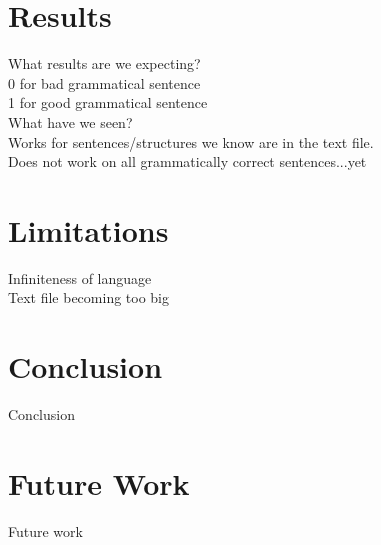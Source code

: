 \documentclass[12pt,a4paper]{article}
\begin{document}
\section{Results}
What results are we expecting?\\
0 for bad grammatical sentence\\
1 for good grammatical sentence\\

What have we seen?\\
Works for sentences/structures we know are in the text file.\\
Does not work on all grammatically correct sentences...yet\\



\section{Limitations}
Infiniteness of language\\
Text file becoming too big\\

\section{Conclusion}
Conclusion

\section{Future Work}
Future work

\newpage



\end{document}

